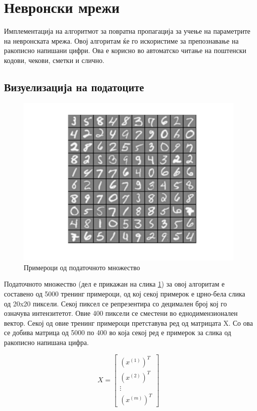 
\section{Невронски мрежи}

Имплементација на алгоритмот за повратна пропагација за учење на параметрите на
невронската мрежа. Овој алгоритам ќе го искористиме за препознавање на ракописно
напишани цифри. Ова е корисно во автоматско читање на поштенски кодови, чекови,
сметки и слично.

\subsection{Визуелизација на податоците}

\begin{figure}[htb]
\centering
\includegraphics[width=.9\textwidth]{src/neuralNetwork2/nn}
\caption{Примероци од податочното множество}
\label{fig:neuralNetworkData}
\end{figure}

Податочното множество (дел е прикажан на слика \ref{fig:neuralNetworkData}) за овој алгоритам е
составено од 5000 тренинг примероци, од кој секој примерок е црно-бела слика од 20x20 пиксели. Секој пиксел се
репрезентира со децимален број кој го означува интензитетот. Овие 400 пиксели се
сместени во еднодимензионален вектор. Секој од овие тренинг примероци
претставува ред од матрицата X. Со ова се добива матрица од 5000 по 400 во која
секој ред е примерок за слика од ракописно напишана цифра.

\[
	X = \begin{bmatrix}
		    (x^{(1)})^T \\
			(x^{(2)})^T \\
			\vdots \\
			(x^{(m)})^T
			
		\end{bmatrix}
\]

